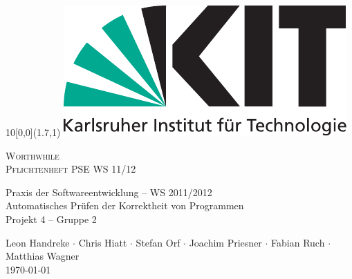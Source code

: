 
\newcommand{\diameter}{20}
\newcommand{\xone}{-30}
\newcommand{\xtwo}{150}
\newcommand{\yone}{15}
\newcommand{\ytwo}{-265}

\begin{titlepage}

	\begin{textblock}{10}[0,0](1.7,1)
		\includegraphics[width=.3\textwidth]{images/kit_logo_de_4c_positiv.pdf}
	\end{textblock}
	\begin{center}
		\fontsize{45}{50}\selectfont
        \vfill
        \textsc{Worthwhile} \\
        \textsc{Pflichtenheft}
        \vfill
		\LARGE
		PSE WS 11/12
  \vfill
 \newpage
 
 \null
 \vfill
 
 Praxis der Softwareentwicklung -- WS 2011/2012 \\
 
  \Large
  Automatisches Prüfen der Korrektheit von Programmen \\
  Projekt 4 -- Gruppe 2 \\
  \medskip
  \vspace{2cm}
  
    Leon Handreke $\cdot$ Chris Hiatt $\cdot$ Stefan Orf $\cdot$ Joachim Priesner $\cdot$ Fabian Ruch $\cdot$ Matthias Wagner
  \vspace{2cm} \\
  \today
	\end{center}
	
  \vfill

\end{titlepage}
